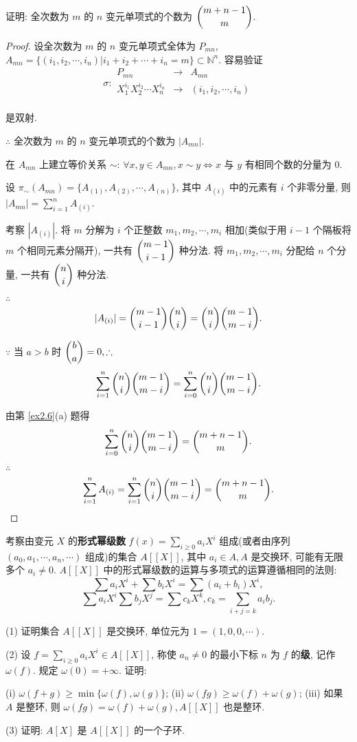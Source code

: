 \documentclass[UTF8]{ctexart}
\begin{document}
\begin{exercise}%
    证明: 全次数为 $m$ 的 $n$ 变元单项式的个数为 $\dbinom{m+n-1}{m}$.
\end{exercise}
\begin{proof}
    设全次数为 $m$ 的 $n$ 变元单项式全体为 $P_{mn}$, $A_{mn}=\{(i_1,i_2,\cdots,i_n)|i_1+i_2+\cdots+i_n=m\}\subset\mathbb{N}^n$. 容易验证
    \[\sigma:\begin{array}{rcl}
        P_{mn} & \to & A_{mn} \\
        X_1^{i_1}X_2^{i_2}\cdots X_n^{i_n} & \to & (i_1,i_2,\cdots,i_n) \\
    \end{array}\]

    是双射.

    $\therefore$ 全次数为 $m$ 的 $n$ 变元单项式的个数为 $|A_{mn}|$.

    在 $A_{mn}$ 上建立等价关系 $\sim$: $\forall x,y\in A_{mn},x\sim y\Leftrightarrow x$ 与 $y$ 有相同个数的分量为 $0$.

    设 $\pi_\sim(A_{mn})=\{A_{(1)},A_{(2)},\cdots,A_{(n)}\}$, 其中 $A_{(i)}$ 中的元素有 $i$ 个非零分量, 则 $|A_{mn}|=\sum\limits_{i=1}^nA_{(i)}$.

    考察 $|A_{(i)}|$. 将 $m$ 分解为 $i$ 个正整数 $m_1,m_2,\cdots,m_i$ 相加(类似于用 $i-1$ 个隔板将 $m$ 个相同元素分隔开), 一共有 $\dbinom{m-1}{i-1}$ 种分法. 将 $m_1,m_2,\cdots,m_i$ 分配给 $n$ 个分量, 一共有 $\dbinom{n}{i}$ 种分法.

    $\therefore$
    \[|A_{(i)}|=\dbinom{m-1}{i-1}\dbinom{n}{i}=\dbinom{n}{i}\dbinom{m-1}{m-i}.\]

    $\because$ 当 $a>b$ 时 $\dbinom{b}{a}=0,\therefore$
    \[\sum\limits_{i=1}^n\dbinom{n}{i}\dbinom{m-1}{m-i}=\sum\limits_{i=0}^n\dbinom{n}{i}\dbinom{m-1}{m-i}.\]

    由第 \ref{ex2.6}(a) 题得
    \[\sum\limits_{i=0}^n\dbinom{n}{i}\dbinom{m-1}{m-i}=\dbinom{m+n-1}{m}.\]

    $\therefore$
    \[\sum\limits_{i=1}^nA_{(i)}=\sum\limits_{i=1}^n\dbinom{n}{i}\dbinom{m-1}{m-i}=\dbinom{m+n-1}{m}.\qedhere\]
\end{proof}
\begin{exercise}\label{ex2.5}
    考察由变元 $X$ 的\textbf{形式幂级数} $f(x)=\sum\limits_{i\geq0}a_iX^i$ 组成(或者由序列 $(a_0,a_1,\cdots,a_n,\cdots)$ 组成)的集合 $A[[X]]$, 其中 $a_i\in A,A$ 是交换环, 可能有无限多个 $a_i\neq0$. $A[[X]]$ 中的形式幂级数的运算与多项式的运算遵循相同的法则:
    \[\sum a_iX^i+\sum b_iX^i=\sum(a_i+b_i)X^i,\]
    \[\sum a_iX^i\sum b_jX^j=\sum c_kX^k,c_k=\sum\limits_{i+j=k}a_ib_j.\]

    (1) 证明集合 $A[[X]]$ 是交换环, 单位元为 $1=(1,0,0,\cdots)$.

    (2) 设 $f=\sum\limits_{i\geq0}a_iX^i\in A[[X]]$, 称使 $a_n\neq0$ 的最小下标 $n$ 为 $f$ 的\textbf{级}, 记作 $\omega(f)$. 规定 $\omega(0)=+\infty$. 证明:

    (i) $\omega(f+g)\geq\min\{\omega(f),\omega(g)\}$; (ii) $\omega(fg)\geq\omega(f)+\omega(g)$; (iii) 如果 $A$ 是整环, 则 $\omega(fg)=\omega(f)+\omega(g),A[[X]]$ 也是整环.
    
    (3) 证明: $A[X]$ 是 $A[[X]]$ 的一个子环.
\end{exercise}
\end{document}
